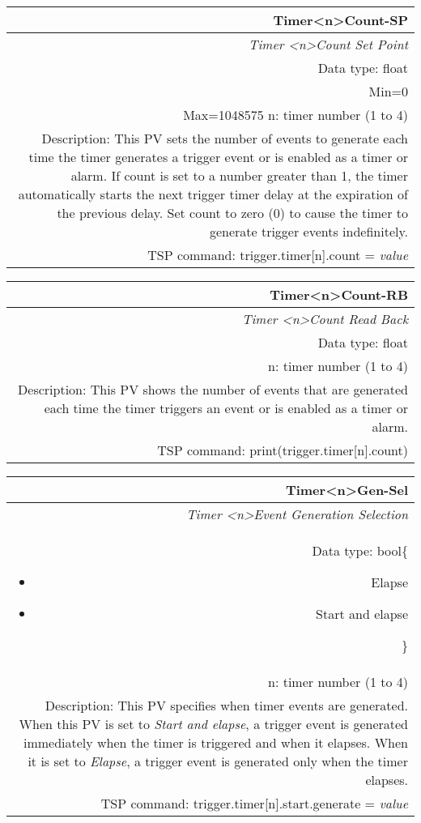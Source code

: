 \documentclass[openany]{article}
\begin{document}
		\begin{tabular}{N}
			\hline
			\bfseries Timer{\textless n\textgreater}Count-SP\label{pv:timercount-sp} \\ \hline
			\emph{Timer \textless n\textgreater Count Set Point} \\
			Data type: float \\
			Min=0 \\
			Max=1048575
			n: timer number (1 to 4) \\
			Description: This PV sets the number of events to generate each time the timer generates a trigger event or is enabled as a timer or alarm. If count is set to a number greater than 1, the timer automatically starts the next trigger timer delay at the expiration of the previous delay. Set count to zero (0) to cause the timer to generate trigger events indefinitely. \\
			TSP command: trigger.timer[n].count = \emph{value}
		\end{tabular}

		\begin{tabular}{N}
			\hline
			\bfseries Timer{\textless n\textgreater}Count-RB\label{pv:timercount-rb} \\ \hline
			\emph{Timer \textless n\textgreater Count Read Back} \\
			Data type: float \\
			n: timer number (1 to 4) \\
			Description: This PV shows the number of events that are generated each time the timer triggers an event or is enabled as a timer or alarm. \\
			TSP command: print(trigger.timer[n].count)
		\end{tabular}

		\begin{tabular}{N}
			\hline
			\bfseries Timer{\textless n\textgreater}Gen-Sel\label{pv:timergen-sel} \\ \hline
			\emph{Timer \textless n\textgreater Event Generation Selection} \\
			Data type: bool\{\begin{itemize}[noitemsep]
				\small
				\item[] Elapse
				\item[] Start and elapse
			\end{itemize}\} \\
			n: timer number (1 to 4) \\
			Description: This PV specifies when timer events are generated. When this PV is set to \emph{Start and elapse}, a trigger event is generated immediately when the timer is triggered and when it elapses. When it is set to \emph{Elapse}, a trigger event is generated only when the timer elapses. \\
			TSP command: trigger.timer[n].start.generate = \emph{value}
		\end{tabular}
\end{document}
